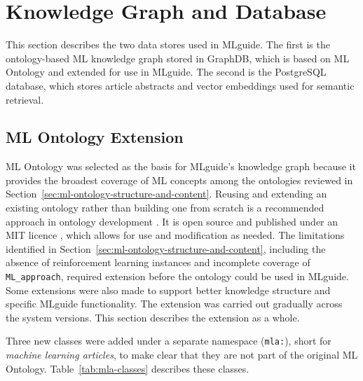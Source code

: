 
\section{Knowledge Graph and Database}
\label{sec:knowledge-graph-and-database}

This section describes the two data stores used in MLguide. The first 
is the ontology-based ML knowledge graph stored in GraphDB, which is based on ML 
Ontology and extended for use in MLguide. The second is the PostgreSQL 
database, which stores article abstracts and vector embeddings used 
for semantic retrieval.

\subsection{ML Ontology Extension}
\label{sec:ml-ontology-extension}

ML Ontology was selected as the basis for MLguide's knowledge graph because it 
provides the broadest coverage of ML concepts among the ontologies 
reviewed in Section~\ref{sec:ml-ontology-structure-and-content}. 
Reusing and extending an existing ontology rather than building one from scratch 
is a recommended approach in ontology development
\parencite{noy2001ontology_development_101_guide_creating_first_ontology}.
It is open source and published under an MIT 
licence \parencite{humm2026industry_ready_machine_learning_ontology}, 
which allows for use and modification as needed.
The limitations identified in 
Section~\ref{sec:ml-ontology-structure-and-content}, including the absence of 
reinforcement learning instances and incomplete coverage of 
\texttt{ML\_approach}, required extension before the ontology could 
be used in MLguide. Some extensions were also made to support better
knowledge structure and specific MLguide functionality. 
The extension was carried out gradually across the system
versions. This section describes the extension as a whole.


Three new classes were added under a separate namespace 
(\texttt{mla:}), short for \textit{machine learning articles}, 
to make clear that they are not part of the original ML Ontology. 
Table~\ref{tab:mla-classes} describes these classes.


